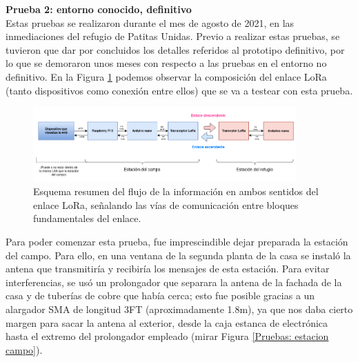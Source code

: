 \documentclass[12pt]{article}
\begin{document}
	
	\noindent \textbf{Prueba 2: entorno conocido, definitivo} \\
	
	\noindent Estas pruebas se realizaron durante el mes de agosto de 2021, en las inmediaciones del refugio de Patitas Unidas. Previo a realizar estas pruebas, se tuvieron que dar por concluidos los detalles referidos al prototipo definitivo, por lo que se demoraron unos meses con respecto a las pruebas en el entorno no definitivo. En la Figura \ref{esquema resumen enlace lora final} podemos observar la composición del enlace LoRa (tanto dispositivos como conexión entre ellos) que se va a testear con esta prueba. \\
	
	\begin{figure}[h!]
		\begin{center}
			\includegraphics[width=0.9\textwidth]{img/conexiones tfg-resumen flujo datos.png}
			\caption{Esquema resumen del flujo de la información en ambos sentidos del enlace LoRa, señalando las vías de comunicación entre bloques fundamentales del enlace.}
			\label{esquema resumen enlace lora final}
		\end{center}
	\end{figure}
	
	\noindent Para poder comenzar esta prueba, fue imprescindible dejar preparada la estación del campo. Para ello, en una ventana de la segunda planta de la casa se instaló la antena que transmitiría  y recibiría los mensajes de esta estación. Para evitar interferencias, se usó un prolongador que separara la antena de la fachada de la casa y de tuberías de cobre que había cerca; esto fue posible gracias a un alargador SMA de longitud 3FT (aproximadamente 1.8m), ya que nos daba cierto margen para sacar la antena al exterior, desde la caja estanca de electrónica hasta el extremo del prolongador empleado (mirar Figura \ref{Pruebas: estacion campo}).\\
	
	\pagebreak
	
\end{document}
